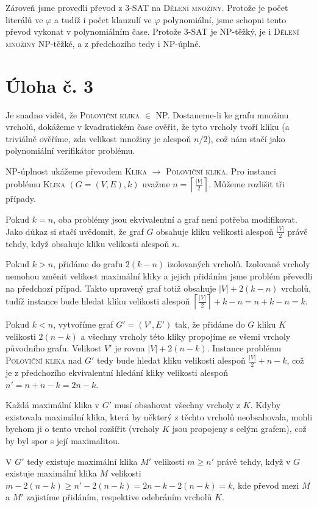 \documentclass{scrartcl}
\begin{document}
Zároveň jsme provedli převod z \textsc{3-SAT} na \textsc{Dělení množiny}. Protože je počet literálů ve $\varphi$ a tudíž i počet klauzulí ve $\varphi$ polynomiální, jsme schopni tento převod vykonat v polynomiálním čase. Protože \textsc{3-SAT} je NP-těžký, je i \textsc{Dělení množiny} NP-těžké, a z předchozího tedy i NP-úplné.

\section*{Úloha č. 3}
Je snadno vidět, že \textsc{Poloviční klika} $\in$ NP. Dostaneme-li ke grafu množinu vrcholů, dokážeme v kvadratickém čase ověřit, že tyto vrcholy tvoří kliku (a triviálně ověříme, zda velikost množiny je alespoň $n/2$), což nám stačí jako polynomiální verifikátor problému. 

NP-úplnost ukážeme převodem \textsc{Klika} $\rightarrow$ \textsc{Poloviční klika}. Pro instanci problému \textsc{Klika} $(G = (V,E), k)$ uvažme $n = \left\lceil \frac{\vert V\vert}{2}\right\rceil$. Můžeme rozlišit tři případy.

Pokud $k = n$, oba problémy jsou ekvivalentní a graf není potřeba modifikovat. Jako důkaz si stačí uvědomit, že graf $G$ obsahuje kliku velikosti alespoň $\frac{\vert V\vert}{2}$ právě tehdy, když obsahuje kliku velikosti alespoň $n$.

Pokud $k > n$, přidáme do grafu $2(k - n)$ izolovaných vrcholů. Izolované vrcholy nemohou změnit velikost maximální kliky a jejich přidáním jsme problém převedli na předchozí případ. Takto upravený graf totiž obsahuje $\vert V\vert + 2(k-n)$ vrcholů, tudíž instance bude hledat kliku velikosti alespoň $\left\lceil\frac{\vert V\vert}{2}\right\rceil + k - n = n + k - n = k$.

Pokud $k < n$, vytvoříme graf $G' = (V', E')$ tak, že přidáme do $G$ kliku $K$ velikosti $2(n - k)$ a všechny vrcholy této kliky propojíme se všemi vrcholy původního grafu. Velikost $V'$ je rovna $\vert V\vert + 2(n - k)$. Instance problému \textsc{Poloviční klika} nad $G'$ tedy bude hledat kliku velikosti alespoň $\frac{\vert V\vert}{2} + n - k$, což je z předchozího ekvivalentní hledání kliky velikosti alespoň $n' = n + n - k = 2n - k$.

Každá maximální klika v $G'$ musí obsahovat všechny vrcholy z $K$. Kdyby existovala maximální klika, která by některý z těchto vrcholů neobsahovala, mohli bychom ji o tento vrchol rozšířit (vrcholy $K$ jsou propojeny s celým grafem), což by byl spor s její maximalitou.

V $G'$ tedy existuje maximální klika $M'$ velikosti $m \geq n'$ právě tehdy, když v $G$ existuje maximální klika $M$ velikosti $m - 2(n - k) \geq n' - 2(n - k) = 2n - k - 2(n - k) = k$, kde převod mezi $M$ a $M'$ zajistíme přidáním, respektive odebráním vrcholů $K$.
\end{document}
